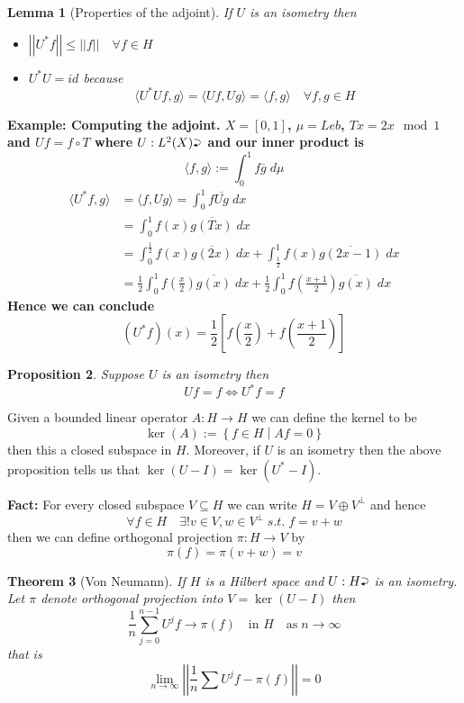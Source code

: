\documentclass[11pt]{article}
\newcommand{\defeq}{:=}
\newcommand{\norm}[1]{\left|\left|#1\right|\right|}
\newcommand{\relmiddle}[1]{\mathrel{}\middle#1\mathrel{}}
\newcommand{\rmv}{\relmiddle|}
\newcommand{\toitself}{\mathbin{\scalebox{.85}{%
    \lefteqn{\scalebox{.5}{$\blacktriangleleft$}}\raisebox{.34ex}{$\supset$}}}}
\newcommand{\mdf}[1]{{\color{RoyalBlue} #1}}
\newenvironment{eg}
	{\begin{mdframed}[backgroundcolor=mylg,roundcorner=5pt,linewidth=0pt]\bfseries{Example:}\normalfont}
	{\end{mdframed}}
\newtheorem{prop}{Proposition}[section]
\newtheorem{theorem}[prop]{Theorem}
\newtheorem{lemma}[prop]{Lemma}
\begin{document}
\begin{lemma}[Properties of the adjoint]
If $U$ is an isometry then 
\begin{itemize}
	\item $\norm{U^\ast f} \leq \norm{f} \quad \forall f\in H$
	\item $U^\ast U = id $ because
		\[
		\langle U^\ast U f, g \rangle = \langle Uf, Ug\rangle = \langle f, g\rangle \quad \forall f,g \in H
		\]
\end{itemize}
\end{lemma}
\begin{eg}
	\textbf{Computing the adjoint.}
	$X=[0,1]$, $\mu=Leb$, $Tx=2x \mod 1$ and $Uf = f\circ T$ where $U:L^2(X)\toitself$ and our inner product is
	\[
		\langle f, g\rangle \defeq \int_0^1 f \overline{g} \; d\mu
	\]
	\begin{align*}
		\langle U^\ast f, g\rangle & = \langle f, Ug\rangle = \int_0^1 f \overline{Ug} \; dx \\
								   & = \int_0^1 f(x)\overline{g(Tx)}\; dx \\
								   & = \int_0^{\frac{1}{2}} f(x)\overline{g(2x)} \; dx + \int_{\frac{1}{2}}^1 f(x)\overline{g(2x-1)}\; dx \\
								   & = \frac{1}{2}\int_0^1 f\left( \frac{x}{2}\right)\overline{g(x)}\; dx + 
										\frac{1}{2}\int_0^1 f\left( \frac{x+1}{2}\right)\overline{g(x)}\; dx
	\end{align*}
	Hence we can conclude 
	\[
		(U^\ast f)(x) = \frac{1}{2}\left[ f \left( \frac{x}{2}\right) + f \left( \frac{x+1}{2}\right)\right]
	\]
\end{eg}

\begin{prop}
Suppose $U$ is an isometry then
\[
Uf=f \iff U^\ast f = f
\]
\end{prop}

Given a bounded linear operator $A:H\to H$ we can define the \mdf{kernel} to be
\[
	\ker(A) \defeq \left\{ f\in H \rmv Af = 0\right\}
\]
then this a closed subspace in $H$.
Moreover, if $U$ is an isometry then the above proposition tells us that $\ker(U-I)=\ker(U^\ast - I)$.

\textbf{Fact: }
For every closed subspace $V\subseteq H$ we can write $H=V \oplus V^\perp$ and hence
\[
\forall f\in H \quad \exists ! v\in V, w\in V^\perp \; s.t. \; f= v+ w
\]
then we can define \mdf{orthogonal projection} $\pi: H \to V$ by
\[
	\pi(f) = \pi (v+ w) = v
\]

\begin{theorem}[Von Neumann]
If $H$ is a Hilbert space and $U:H\toitself$ is an isometry.
Let $\pi$ denote orthogonal projection into $V=\ker(U-I)$ then
\[
	\frac{1}{n}\sum_{j=0}^{n-1}U^j f \to \pi (f) \quad \text{in }H \quad \text{as} \; n\to \infty
\]
that is
\[
\lim_{n\to\infty}\norm{\frac{1}{n}\sum U^j f - \pi(f)} = 0
\]
\end{theorem}
\end{document}
